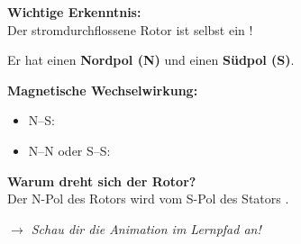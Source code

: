 \documentclass[11pt, a4paper]{article}
\newcommand{\luecke}[1]{\underline{\hspace{#1}}}
\begin{document}

\begin{merkkasten}

\textbf{Wichtige Erkenntnis:}\\
Der stromdurchflossene Rotor ist selbst ein \luecke{3cm}!

Er hat einen \textbf{Nordpol (N)} und einen \textbf{Südpol (S)}.

\vspace{3mm}
\begin{minipage}{0.48\textwidth}
\textbf{Magnetische Wechselwirkung:}
\begin{itemize}[noitemsep, leftmargin=*]
    \item N--S: \luecke{2.5cm}
    \item N--N oder S--S: \luecke{2.5cm}
\end{itemize}
\end{minipage}
\hfill
\begin{minipage}{0.48\textwidth}
\textbf{Warum dreht sich der Rotor?}\\
Der \textcolor{positiv}{N}-Pol des Rotors wird vom \textcolor{negativ}{S}-Pol des Stators \luecke{2.5cm}.
\end{minipage}

\vspace{3mm}
{\small\textit{$\rightarrow$ Schau dir die Animation im Lernpfad an!}}

\end{merkkasten}

\end{document}
